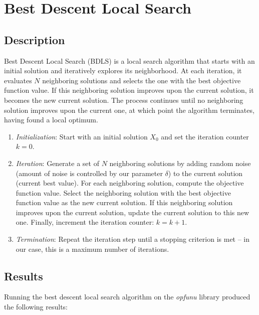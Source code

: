 \documentclass{article}
\begin{document}
\section{Best Descent Local Search}

\subsection{Description}

Best Descent Local Search (BDLS) is a local search algorithm that
starts with an initial solution and iteratively explores its
neighborhood. At each iteration, it evaluates $N$ neighboring solutions
and selects the one with the best objective function value. If this
neighboring solution improves upon the current solution, it becomes the
new current solution. The process continues until no neighboring
solution improves upon the current one, at which point the algorithm
terminates, having found a local optimum.

\begin{enumerate}
  \item \textit{Initialization}: Start with an initial solution $X_0$
    and set the iteration counter $k = 0$.
  \item \textit{Iteration}: Generate a set of $N$ neighboring solutions
    by adding random noise (amount of noise is controlled by our
    parameter $\delta$) to the current solution (current best value). For each
    neighboring solution, compute the objective function value. Select
    the neighboring solution with the best objective function value
    as the new current solution. If this neighboring solution improves
    upon the current solution, update the current solution to this new
    one. Finally, increment the iteration counter: $k = k + 1$.
  \item \textit{Termination}: Repeat the iteration step until a
    stopping criterion is met -- in our case, this is a maximum number
    of iterations.
\end{enumerate}

\subsection{Results}

Running the best descent local search algorithm on the \textit{opfunu} library
produced the following results:
\end{document}
